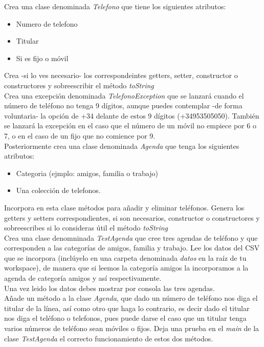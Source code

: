 \documentclass[addpoints,12pt]{exam}
\begin{document}
\begin{questions}
\question Crea una clase denominada \emph{Telefono} que tiene los siguientes atributos:
\begin{itemize}
\item Numero de telefono
\item Titular
\item Si es fijo o móvil
\end{itemize}
Crea -si lo ves necesario- los correspondeintes getters, setter, constructor o constructores y sobreescribir el  método \emph{toString}\\
Crea una excepción denominada \emph{TelefonoException} que se lanzará cuando el número de teléfono no tenga 9 dígitos, aunque puedes contemplar -de forma voluntaria- la opción de +34 delante de estos 9 dígitos (+34953505050). También se lanzará la excepción en el caso que el número de un móvil no empiece por 6 o 7, o en el caso de un fijo que no comience por 9. \\ 
Posteriormente crea una clase denominada \emph{Agenda} que tenga los siguientes atributos:
\begin{itemize}
\item Categoria (ejmplo: amigos, familia o trabajo)
\item Una colección de telefonos.
\end{itemize}
Incorpora en esta clase métodos para añadir y eliminar teléfonos. Genera los getters y setters correspondientes, si son necesarios, constructor o constructores y sobreescribes si lo consideras útil el método \emph{toString} 
\vspace{0.3cm}
\\
Crea una clase denomninada \emph{TestAgenda} que cree tres agendas de teléfono y que corresponden a las categorías de amigos, familia y trabajo. Lee los datos del CSV que se incorpora (inclúyelo en una carpeta denominada \emph{datos} en la raíz de tu workspace), de manera que si leemos la categoría amigos la incorporamos a la agenda de categoría amigos y así respectivamente.
\vspace{0.3cm}
\\
Una vez leido los datos debes mostrar por consola las tres agendas.
\vspace{0.3cm}
\\
Añade un método a la clase \emph{Agenda}, que dado un número de teléfono nos diga el titular de la línea, así como otro que haga lo contrario, es decir dado el titular nos diga el teléfono o telefonos, pues puede darse el caso que un titular tenga varios números de teléfono sean móviles o fijos. Deja una prueba en el \emph{main} de la clase \emph{TestAgenda} el correcto funcionamiento de estos dos métodos.\\

\end{questions}
\end{document}
